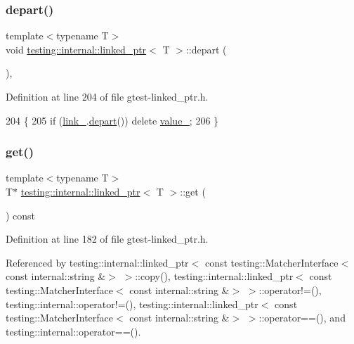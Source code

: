 \subsubsection{\texorpdfstring{depart()}{depart()}}
{\footnotesize\ttfamily template$<$typename T$>$ \\
void \hyperlink{classtesting_1_1internal_1_1linked__ptr}{testing\+::internal\+::linked\+\_\+ptr}$<$ T $>$\+::depart (\begin{DoxyParamCaption}{ }\end{DoxyParamCaption})\hspace{0.3cm}{\ttfamily [inline]}, {\ttfamily [private]}}



Definition at line 204 of file gtest-\/linked\+\_\+ptr.\+h.


\begin{DoxyCode}
204                 \{
205     \textcolor{keywordflow}{if} (\hyperlink{classtesting_1_1internal_1_1linked__ptr_a8fdfa75fea8bfc10825a3cc53c50461f}{link\_}.\hyperlink{classtesting_1_1internal_1_1linked__ptr__internal_a8699e539d9702d363ef0351012d1b3ca}{depart}()) \textcolor{keyword}{delete} \hyperlink{classtesting_1_1internal_1_1linked__ptr_abb52c4e944fc7a24a4ec7788b612fb37}{value\_};
206   \}
\end{DoxyCode}
\mbox{\label{classtesting_1_1internal_1_1linked__ptr_a0c2ba99eb3521806f83f5c4435465ce0}} 
\subsubsection{\texorpdfstring{get()}{get()}}
{\footnotesize\ttfamily template$<$typename T$>$ \\
T$\ast$ \hyperlink{classtesting_1_1internal_1_1linked__ptr}{testing\+::internal\+::linked\+\_\+ptr}$<$ T $>$\+::get (\begin{DoxyParamCaption}{ }\end{DoxyParamCaption}) const\hspace{0.3cm}{\ttfamily [inline]}}



Definition at line 182 of file gtest-\/linked\+\_\+ptr.\+h.



Referenced by testing\+::internal\+::linked\+\_\+ptr$<$ const testing\+::\+Matcher\+Interface$<$ const internal\+::string \&$>$ $>$\+::copy(), testing\+::internal\+::linked\+\_\+ptr$<$ const testing\+::\+Matcher\+Interface$<$ const internal\+::string \&$>$ $>$\+::operator!=(), testing\+::internal\+::operator!=(), testing\+::internal\+::linked\+\_\+ptr$<$ const testing\+::\+Matcher\+Interface$<$ const internal\+::string \&$>$ $>$\+::operator==(), and testing\+::internal\+::operator==().


